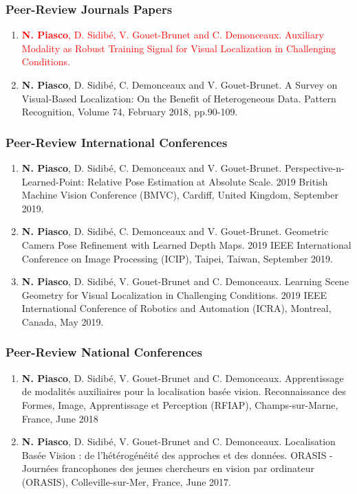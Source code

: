 \begin{publication}

\subsubsection*{Peer-Review Journals Papers}

\begin{enumerate}\scriptsize
	\item \textcolor{red}{\textbf{N. Piasco}, D. Sidib\'e, V. Gouet-Brunet and C. Demonceaux. Auxiliary Modality as Robust Training Signal for
Visual Localization in Challenging Conditions.}
	\item \textbf{N. Piasco}, D. Sidib\'e, C. Demonceaux and V. Gouet-Brunet. A Survey on Visual-Based Localization: On the Benefit of Heterogeneous Data. Pattern Recognition, Volume 74, February 2018, pp.90-109.
\end{enumerate}

\subsubsection*{Peer-Review International Conferences}

\begin{enumerate}\scriptsize
	\item \textbf{N. Piasco}, D. Sidib\'e, C. Demonceaux and V. Gouet-Brunet. Perspective-n-Learned-Point: Relative Pose
Estimation at Absolute Scale. 2019 British Machine Vision Conference (BMVC), Cardiff, United Kingdom, September 2019.
	\item \textbf{N. Piasco}, D. Sidib\'e, C. Demonceaux and V. Gouet-Brunet. Geometric Camera Pose Refinement with Learned Depth Maps. 2019 IEEE International Conference on Image Processing (ICIP), Taipei, Taiwan, September 2019.
	\item \textbf{N. Piasco}, D. Sidib\'e, V. Gouet-Brunet and C. Demonceaux. Learning Scene Geometry for Visual Localization in Challenging Conditions. 2019 IEEE International Conference of Robotics and Automation (ICRA), Montreal, Canada, May 2019.	
\end{enumerate}

\subsubsection*{Peer-Review National Conferences}

\begin{enumerate}\scriptsize
	\item \textbf{N. Piasco}, D. Sidib\'e, V. Gouet-Brunet and C. Demonceaux. Apprentissage de modalit\'es auxiliaires pour la localisation bas\'ee vision. Reconnaissance des Formes, Image, Apprentissage et Perception (RFIAP), Champs-sur-Marne, France, June 2018
	\item \textbf{N. Piasco}, D. Sidib\'e, V. Gouet-Brunet and C. Demonceaux. Localisation Bas\'ee Vision : de l’h\'et\'erog\'en\'eit\'e des approches et des données. ORASIS - Journ\'ees francophones des jeunes chercheurs en vision par ordinateur (ORASIS), Colleville-sur-Mer, France, June 2017.
\end{enumerate}


\end{publication}
